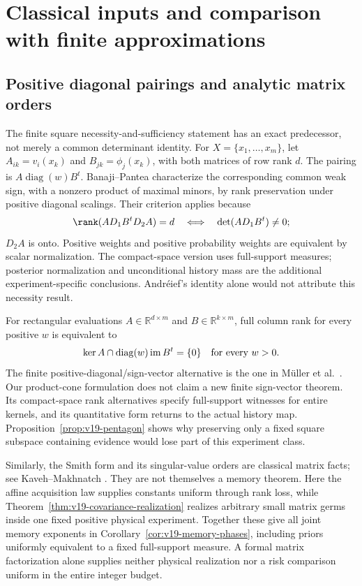 \documentclass[11pt]{amsart}
\theoremstyle{definition}\newtheorem{definition}[theorem]{Definition}
\theoremstyle{remark}\newtheorem{remark}[theorem]{Remark}
\newcommand{\R}{\mathbb R}\newcommand{\N}{\mathbb N}\newcommand{\C}{\mathbb C}
\begin{document}
\endgroup
\section{Classical inputs and comparison with finite approximations}
\label{app:comparison}\label{sec:literature-comparison}
\subsection{Positive diagonal pairings and analytic matrix orders}
\label{sec:v19-comparison}
The finite square necessity-and-sufficiency statement has an exact
predecessor, not merely a common determinant identity. For
$X=\{x_1,\ldots,x_m\}$, let
$A_{ik}=v_i(x_k)$ and $B_{jk}=\phi_j(x_k)$, with both matrices of
row rank $d$. The pairing is $A\operatorname{diag}(w)B^t$.
Banaji--Pantea \cite[Definition 2.24 and Lemma 2.36]{BanajiPantea2016}
characterize the corresponding common weak sign, with a nonzero
product of maximal minors, by rank preservation under positive
diagonal scalings. Their criterion applies because
\[
 \rank(AD_1B^tD_2A)=d
       \quad\Longleftrightarrow\quad\det(AD_1B^t)\ne0;
\]
$D_2A$ is onto. Positive weights and positive probability weights
are equivalent by scalar normalization. The compact-space version
uses full-support measures; posterior normalization and unconditional
history mass are the additional experiment-specific conclusions.
Andr\'eief's identity alone would not attribute this necessity result.

For rectangular evaluations $A\in\R^{d\times m}$ and
$B\in\R^{k\times m}$, full column rank for every positive $w$ is
equivalent to
\[
 \ker A\cap\operatorname{diag}(w)\operatorname{im}B^t=\{0\}
                     \quad\hbox{for every }w>0.
\]
The finite positive-diagonal/sign-vector alternative is the one in
M\"uller et al.\ \cite[Lemma 2.1]{MullerEtAl2016}. Our product-cone
formulation does not claim a new finite sign-vector theorem. Its
compact-space rank alternatives specify full-support witnesses for
entire kernels, and its quantitative form returns to the actual
history map. Proposition~\ref{prop:v19-pentagon} shows why preserving
only a fixed square subspace containing evidence would lose part of
this experiment class.

Similarly, the Smith form and its singular-value orders are classical
matrix facts; see Kaveh--Makhnatch \cite[Theorem 1.1]{KavehMakhnatch}.
They are not themselves a memory theorem. Here the affine acquisition
law supplies constants uniform through rank loss, while
Theorem~\ref{thm:v19-covariance-realization} realizes arbitrary small
matrix germs inside one fixed positive physical experiment. Together
these give all joint memory exponents in
Corollary~\ref{cor:v19-memory-phases}, including priors uniformly
equivalent to a fixed full-support measure. A formal matrix
factorization alone supplies neither physical realization nor a risk
comparison uniform in the entire integer budget.
\end{document}
